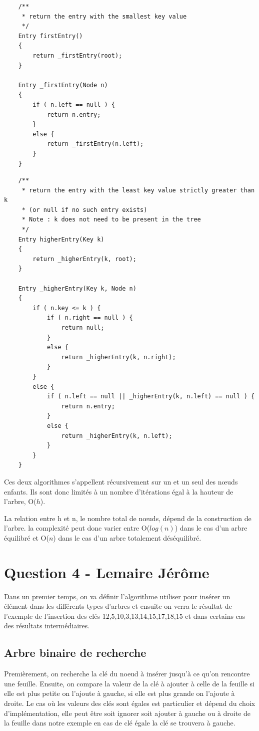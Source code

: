 \documentclass[10pt,a4paper]{article}
\begin{document}
	\begin{lstlisting}
	/**
	 * return the entry with the smallest key value
	 */
	Entry firstEntry()
	{
		return _firstEntry(root);
	}
	
	Entry _firstEntry(Node n)
	{
		if ( n.left == null ) {
			return n.entry;
		}
		else {
			return _firstEntry(n.left);
		}
	}
	\end{lstlisting}
	
	\begin{lstlisting}
	/**
	 * return the entry with the least key value strictly greater than k 
	 * (or null if no such entry exists)
	 * Note : k does not need to be present in the tree
	 */
	Entry higherEntry(Key k)
	{
		return _higherEntry(k, root);
	}
	
	Entry _higherEntry(Key k, Node n)
	{
		if ( n.key <= k ) {
			if ( n.right == null ) {
				return null;
			}
			else {
				return _higherEntry(k, n.right);
			}
		}
		else {
			if ( n.left == null || _higherEntry(k, n.left) == null ) {
				return n.entry;
			}
			else {
				return _higherEntry(k, n.left);
			}
		}
	}
	\end{lstlisting}
	
	Ces deux algorithmes s'appellent récursivement sur un et un seul des nœuds enfants. Ils sont donc limités à un nombre d'itérations égal à la hauteur de l'arbre, O($h$).
	
	La relation entre h et n, le nombre total de nœuds, dépend de la construction de l'arbre. la complexité peut donc varier entre O($log(n)$) dans le cas d'un arbre équilibré et O($n$) dans le cas d'un arbre totalement déséquilibré.
	
\section*{Question 4 - Lemaire Jérôme}

Dans un premier temps, on va définir l'algorithme utiliser pour insérer un élément dans les différents types d'arbres et ensuite on verra le résultat de l'exemple de l'insertion des clés 12,5,10,3,13,14,15,17,18,15 et dans certains cas des résultats intermédiaires.

\subsection*{Arbre binaire de recherche}

Premièrement, on recherche la clé du noeud à insérer jusqu'à ce qu'on rencontre une feuille. Ensuite, on compare la valeur de la clé à ajouter à celle de la feuille si elle est plus petite on l'ajoute à gauche, si elle est plus grande on l'ajoute à droite. Le cas où les valeurs des clés sont égales est particulier et dépend du choix d'implémentation, elle peut être soit ignorer soit ajouter à gauche ou à droite de la feuille dans notre exemple en cas de clé égale la clé se trouvera à gauche.
\end{document}
